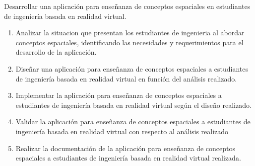 
Desarrollar una aplicación para enseñanza de conceptos espaciales en estudiantes de ingeniería basada en realidad virtual.



\newcommand{\oeOne}{Analizar la situacion que presentan los estudiantes de ingenieria al abordar conceptos espaciales, identificando las necesidades y requerimientos para el desarrollo de la aplicación.}
\newcommand{\oeTwo}{Diseñar una aplicación para enseñanza de conceptos espaciales a estudiantes de ingeniería basada en realidad virtual en función del análisis realizado.}
\newcommand{\oeThree}{Implementar la aplicación para enseñanza de conceptos espaciales a estudiantes de ingeniería basada en realidad virtual según el diseño realizado.}
\newcommand{\oeFour}{Validar la aplicación para enseñanza de conceptos espaciales a estudiantes de ingeniería basada en realidad virtual con respecto al análisis realizado}
\newcommand{\oeFive}{Realizar la documentación de la aplicación para enseñanza de conceptos espaciales a estudiantes de ingeniería basada en realidad virtual realizada.}
\begin{enumerate}
  \item \oeOne
  \item \oeTwo
  \item \oeThree
  \item \oeFour
  \item \oeFive
\end{enumerate}

\clearpage
